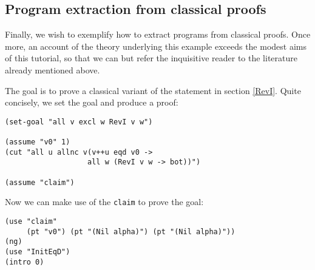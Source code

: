 \documentclass[12pt]{amsart}
\newcommand{\inquotes}[1]{``#1''}
\begin{document}






\subsection{Program extraction from classical proofs}
Finally, we wish to exemplify how to extract programs from classical
proofs.  Once more, an account of the theory underlying this example
exceeds the modest aims of this tutorial, so that we can but refer the
inquisitive reader to the literature already mentioned above.

The goal is to prove a classical variant of the statement in section
\ref{RevI}.  Quite concisely, we set the goal and produce a proof:
\begin{verbatim}
(set-goal "all v excl w RevI v w")

(assume "v0" 1)
(cut "all u allnc v(v++u eqd v0 ->
                   all w (RevI v w -> bot))")

(assume "claim")
\end{verbatim}

Now we can make use of the \texttt{claim} to prove the goal:
\begin{verbatim}
(use "claim"
     (pt "v0") (pt "(Nil alpha)") (pt "(Nil alpha)"))
(ng)
(use "InitEqD")
(intro 0)
\end{verbatim}
\end{document}
